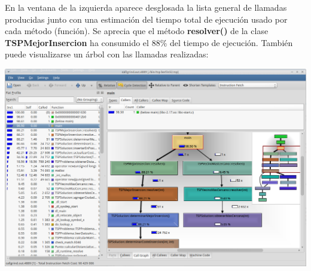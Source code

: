 \documentclass[11pt,a4paper,professionalfonts]{article}
\begin{document}
En la ventana de la izquierda aparece desglosada la lista general de llamadas
producidas junto con una estimación del tiempo total de ejecución usado por
cada método (función). Se aprecia que el método \textbf{resolver()} de la clase
\textbf{TSPMejorInsercion} ha consumido el $88\%$ del tiempo de ejecución. También
puede visualizarse un árbol con las llamadas realizadas:

\begin{center}
\includegraphics[scale=0.40]{kcachegrind2.png}
\end{center}
\end{document}
